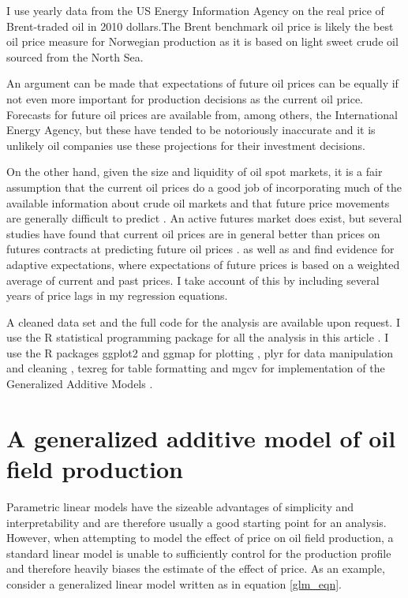 \documentclass[11pt]{article}
\begin{document}
I use yearly data from the US Energy Information Agency on the real price of Brent-traded oil in 2010 dollars.The Brent benchmark oil price is likely the best oil price measure for Norwegian production as it is based on light sweet crude oil sourced from the North Sea.  

An argument can be made that expectations of future oil prices can be equally if not even more important for production decisions as the current oil price.  Forecasts for future oil prices are available from, among others, the International Energy Agency, but these have tended to be notoriously inaccurate and it is unlikely oil companies use these projections for their investment decisions.  

On the other hand, given the size and liquidity of oil spot markets, it is a fair assumption that the current oil prices do a good job of incorporating much of the available information about crude oil markets and that future price movements are generally difficult to predict \citep{hamilton_understanding_2008}.  An active futures market does exist, but several studies have found that current oil prices are in general better than prices on futures contracts at predicting future oil prices \citep{alquist_what_2010, chinn_predictive_2005}.  \citet{mohn_investment_2008} as well as \citet{pesaran_econometric_1990} and \citet{farzin_impact_2001} find evidence for adaptive expectations, where expectations of future prices is based on a weighted average of current and past prices.  I take account of this by including several years of price lags in my regression equations.  

A cleaned data set and the full code for the analysis are available upon request. I use the R statistical programming package for all the analysis in this article \citep{r_core_team_r:_2013}.  I use the R packages ggplot2 and ggmap for plotting \citep{wickham_ggplot2:_2009, kahle_ggmap:_2013}, plyr for data manipulation and cleaning \citep{wickham_split-apply-combine_2011}, texreg for table formatting \citep{leifeld_texreg:_2013} and mgcv for implementation of the Generalized Additive Models \citep{wood_fast_2011}.

\section{A generalized additive model of oil field production}
Parametric linear models have the sizeable advantages of simplicity and interpretability and are therefore usually a good starting point for an analysis.  However, when attempting to model the effect of price on oil field production, a standard linear model is unable to sufficiently control for the production profile and therefore heavily biases the estimate of the effect of price.  As an example, consider a generalized linear model written as in equation \ref{glm_eqn}. 
\end{document}
